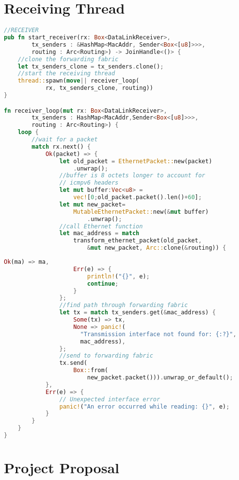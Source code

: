 \documentclass[12pt,a4paper,twoside,openany]{report}
\begin{document}
\chapter{Receiving Thread}
\label{appendix::receiving}
\centering
\begin{varwidth}{\linewidth}
\begin{lstlisting}[language=Rust]
//RECEIVER
pub fn start_receiver(rx: Box<DataLinkReceiver>, 
        tx_senders : &HashMap<MacAddr, Sender<Box<[u8]>>>, 
        routing : Arc<Routing>) -> JoinHandle<()> {
    //clone the forwarding fabric
    let tx_senders_clone = tx_senders.clone();
    //start the receiving thread
    thread::spawn(move|| receiver_loop(
            rx, tx_senders_clone, routing))
}

fn receiver_loop(mut rx: Box<DataLinkReceiver>, 
        tx_senders : HashMap<MacAddr,Sender<Box<[u8]>>>, 
        routing : Arc<Routing>) {
    loop {
    	//wait for a packet
        match rx.next() {
            Ok(packet) => { 
                let old_packet = EthernetPacket::new(packet)
                    .unwrap();
                //buffer is 8 octets longer to account for 
                // icmpv6 headers
                let mut buffer:Vec<u8> = 
                    vec![0;old_packet.packet().len()+60];
                let mut new_packet= 
                    MutableEthernetPacket::new(&mut buffer)
                        .unwrap();
                //call Ethernet function
                let mac_address = match 
                    transform_ethernet_packet(old_packet, 
                        &mut new_packet, Arc::clone(&routing)) {
\end{lstlisting}
\end{varwidth}
\newpage
\begin{varwidth}{\linewidth}
\begin{lstlisting}[language=Rust]
                    Ok(ma) => ma,
                    Err(e) => {
                        println!("{}", e);
                        continue;
                    }
                };
                //find path through forwarding fabric
                let tx = match tx_senders.get(&mac_address) {
                    Some(tx) => tx,
                    None => panic!(
                      "Transmission interface not found for: {:?}",
                      mac_address),
                };
                //send to forwarding fabric
                tx.send(
                    Box::from(
                        new_packet.packet())).unwrap_or_default();
            },
            Err(e) => {
                // Unexpected interface error
                panic!("An error occurred while reading: {}", e);
            }
        }
    }
}
\end{lstlisting}
\end{varwidth}



\chapter*{Project Proposal}
\label{project_proposal}


\end{document}
